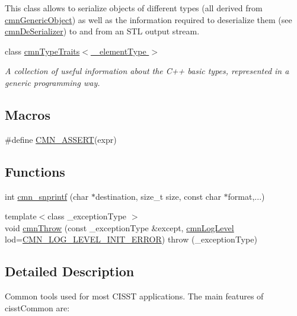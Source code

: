 \begin{DoxyCompactItemize}
\begin{DoxyCompactList}
This class allows to serialize objects of different types (all derived from \hyperlink{classcmn_generic_object}{cmn\-Generic\-Object}) as well as the information required to deserialize them (see \hyperlink{classcmn_de_serializer}{cmn\-De\-Serializer}) to and from an S\-T\-L output stream. \end{DoxyCompactList}\item 
class \hyperlink{classcmn_type_traits}{cmn\-Type\-Traits$<$ \-\_\-element\-Type $>$}
\begin{DoxyCompactList}\small\item\em A collection of useful information about the C++ basic types, represented in a generic programming way. \end{DoxyCompactList}\end{DoxyCompactItemize}
\subsection*{Macros}
\begin{DoxyCompactItemize}
\item 
\#define \hyperlink{group__cisst_common_ga6a12b7031ea38ac5bf5937b8633c97ff}{C\-M\-N\-\_\-\-A\-S\-S\-E\-R\-T}(expr)
\end{DoxyCompactItemize}
\subsection*{Functions}
\begin{DoxyCompactItemize}
\item 
int \hyperlink{group__cisst_common_gaf21f20c37f6fb16a23a0980df1bda1ba}{cmn\-\_\-snprintf} (char $\ast$destination, size\-\_\-t size, const char $\ast$format,...)
\item 
{\footnotesize template$<$class \-\_\-exception\-Type $>$ }\\void \hyperlink{group__cisst_common_gacb3726c72c45ad903298d6b72518b99e}{cmn\-Throw} (const \-\_\-exception\-Type \&except, \hyperlink{cmn_log_lo_d_8h_a70c67165c37a0971e0dd1a85d4edaaae}{cmn\-Log\-Level} lod=\hyperlink{cmn_log_lo_d_8h_a7ad431df88335f9088fc2c38d5199ff8}{C\-M\-N\-\_\-\-L\-O\-G\-\_\-\-L\-E\-V\-E\-L\-\_\-\-I\-N\-I\-T\-\_\-\-E\-R\-R\-O\-R})  throw (\-\_\-exception\-Type)
\end{DoxyCompactItemize}


\subsection{Detailed Description}
Common tools used for most C\-I\-S\-S\-T applications. The main features of cisst\-Common are\-:


